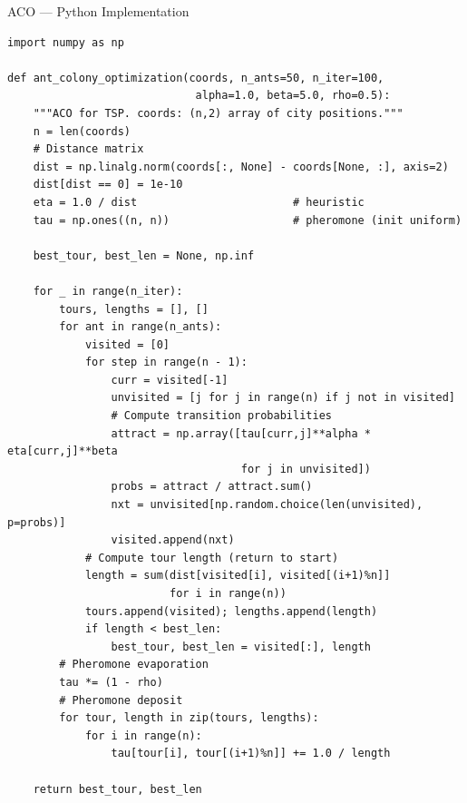 \documentclass[aspectratio=169,10pt]{beamer}
\begin{document}
\begin{frame}[fragile]{ACO --- Python Implementation}
\begin{lstlisting}[style=pystyle, caption={Ant colony optimization for TSP (Python)}]
import numpy as np

def ant_colony_optimization(coords, n_ants=50, n_iter=100,
                             alpha=1.0, beta=5.0, rho=0.5):
    """ACO for TSP. coords: (n,2) array of city positions."""
    n = len(coords)
    # Distance matrix
    dist = np.linalg.norm(coords[:, None] - coords[None, :], axis=2)
    dist[dist == 0] = 1e-10
    eta = 1.0 / dist                        # heuristic
    tau = np.ones((n, n))                   # pheromone (init uniform)

    best_tour, best_len = None, np.inf

    for _ in range(n_iter):
        tours, lengths = [], []
        for ant in range(n_ants):
            visited = [0]
            for step in range(n - 1):
                curr = visited[-1]
                unvisited = [j for j in range(n) if j not in visited]
                # Compute transition probabilities
                attract = np.array([tau[curr,j]**alpha * eta[curr,j]**beta
                                    for j in unvisited])
                probs = attract / attract.sum()
                nxt = unvisited[np.random.choice(len(unvisited), p=probs)]
                visited.append(nxt)
            # Compute tour length (return to start)
            length = sum(dist[visited[i], visited[(i+1)%n]]
                         for i in range(n))
            tours.append(visited); lengths.append(length)
            if length < best_len:
                best_tour, best_len = visited[:], length
        # Pheromone evaporation
        tau *= (1 - rho)
        # Pheromone deposit
        for tour, length in zip(tours, lengths):
            for i in range(n):
                tau[tour[i], tour[(i+1)%n]] += 1.0 / length

    return best_tour, best_len
\end{lstlisting}
\end{frame}
\end{document}
